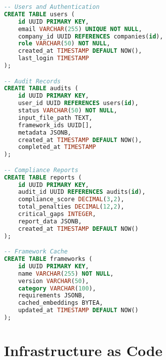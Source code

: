 \documentclass[12pt,a4paper]{report}
\begin{document}
\begin{lstlisting}[language=SQL, caption=Core Database Tables]
-- Users and Authentication
CREATE TABLE users (
    id UUID PRIMARY KEY,
    email VARCHAR(255) UNIQUE NOT NULL,
    company_id UUID REFERENCES companies(id),
    role VARCHAR(50) NOT NULL,
    created_at TIMESTAMP DEFAULT NOW(),
    last_login TIMESTAMP
);

-- Audit Records
CREATE TABLE audits (
    id UUID PRIMARY KEY,
    user_id UUID REFERENCES users(id),
    status VARCHAR(50) NOT NULL,
    input_file_path TEXT,
    framework_ids UUID[],
    metadata JSONB,
    created_at TIMESTAMP DEFAULT NOW(),
    completed_at TIMESTAMP
);

-- Compliance Reports
CREATE TABLE reports (
    id UUID PRIMARY KEY,
    audit_id UUID REFERENCES audits(id),
    compliance_score DECIMAL(3,2),
    total_penalties DECIMAL(12,2),
    critical_gaps INTEGER,
    report_data JSONB,
    created_at TIMESTAMP DEFAULT NOW()
);

-- Framework Cache
CREATE TABLE frameworks (
    id UUID PRIMARY KEY,
    name VARCHAR(255) NOT NULL,
    version VARCHAR(50),
    category VARCHAR(100),
    requirements JSONB,
    cached_embeddings BYTEA,
    updated_at TIMESTAMP DEFAULT NOW()
);
\end{lstlisting}

\section{Infrastructure as Code}
\end{document}
